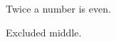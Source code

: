 \begin{theorem}\label{thm:main}
  \leanok
  Twice a number is even.
\end{theorem}
\begin{theorem}\label{thm:classical}
  \leanok
  Excluded middle.
\end{theorem}
